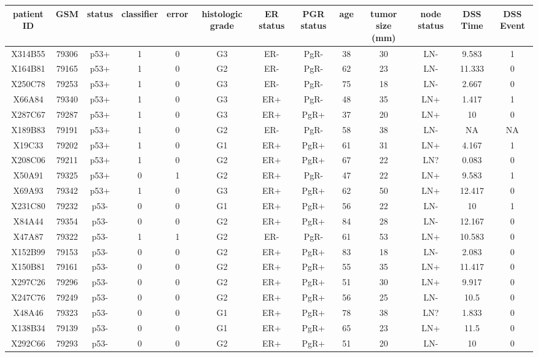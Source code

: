 \documentclass{article}
\begin{document}
\begin{center} \label{table}
\resizebox{14cm}{!} {
\begin{tabular}{||c|c|c|c|c|c|c|c|c|c|c|c|c||} \hline
patient ID & GSM & status & classifier & error & histologic grade & ER status & PGR status & age & tumor size (mm) & node status & DSS Time & DSS Event\\ \hline
X314B55 & 79306 & p53+ & 1 & 0 & G3 & ER- & PgR- & 38 & 30 & LN- & 9.583 & 1\\ \hline
X164B81 & 79165 & p53+ & 1 & 0 & G2 & ER- & PgR- & 62 & 23 & LN- & 11.333 & 0\\ \hline
X250C78 & 79253 & p53+ & 1 & 0 & G3 & ER- & PgR- & 75 & 18 & LN- & 2.667 & 0\\ \hline
X66A84 & 79340 & p53+ & 1 & 0 & G3 & ER+ & PgR- & 48 & 35 & LN+ & 1.417 & 1\\ \hline
X287C67 & 79287 & p53+ & 1 & 0 & G3 & ER+ & PgR+ & 37 & 20 & LN+ & 10 & 0\\ \hline
X189B83 & 79191	& p53+ & 1 & 0 & G2 & ER- & PgR- & 58 & 38 & LN- & NA & NA\\ \hline
X19C33	& 79202 & p53+ & 1 & 0 & G1 & ER+ & PgR+ & 61 & 31 & LN+ & 4.167 & 1 \\ \hline
X208C06	& 79211 & p53+ & 1 & 0 & G2 & ER+ & PgR+ & 67 & 22 & LN? & 0.083 & 0 \\ \hline
X50A91	& 79325 & p53+ & 0 & 1 & G2 & ER+ & PgR- & 47 & 22 & LN+ & 9.583 & 1 \\ \hline
X69A93	& 79342 & p53+ & 1 & 0 & G3 & ER+ & PgR+ & 62 & 50 & LN+ & 12.417 & 0\\ \hline
X231C80	& 79232 & p53- & 0 & 0 & G1 & ER+ & PgR+ & 56 & 22 & LN- & 10 & 1\\ \hline
X84A44	& 79354 & p53- & 0 & 0 & G2 & ER+ & PgR+ & 84 & 28 & LN- & 12.167 & 0\\ \hline
X47A87	& 79322 & p53- & 1 & 1 & G2 & ER- & PgR- & 61 & 53 & LN+ & 10.583 & 0\\ \hline
X152B99	& 79153 & p53- & 0 & 0 & G2 & ER+ & PgR+ & 83 & 18 & LN- & 2.083 & 0\\ \hline
X150B81	& 79161 & p53- & 0 & 0 & G2 & ER+ & PgR+ & 55 & 35 & LN+ & 11.417 & 0\\ \hline
X297C26	& 79296 & p53- & 0 & 0 & G2 & ER+ & PgR+ & 51 & 30 & LN+ & 9.917 & 0\\ \hline
X247C76	& 79249 & p53- & 0 & 0 & G2 & ER+ & PgR+ & 56 & 25 & LN- & 10.5 & 0\\ \hline
X48A46	& 79323 & p53- & 0 & 0 & G1 & ER+ & PgR+ & 78 & 38 & LN? & 1.833 & 0\\ \hline
X138B34	& 79139 & p53- & 0 & 0 & G1 & ER+ & PgR+ & 65 & 23 & LN+ & 11.5 & 0\\ \hline
X292C66	& 79293 & p53- & 0 & 0 & G2 & ER+ & PgR+ & 51 & 20 & LN- & 10 & 0\\ \hline\hline

\end{tabular}
}
\end{center}
\end{document}
